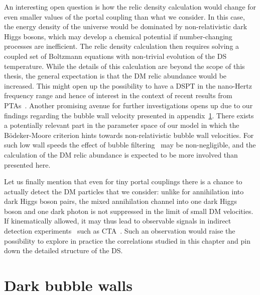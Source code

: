 An interesting open question is how the relic density calculation would change for even smaller values of the portal coupling than what we consider. In this case, the energy density of the universe would be dominated by non-relativistic dark Higgs bosons, which may develop a chemical potential if number-changing processes are inefficient. The relic density calculation then requires solving a coupled set of Boltzmann equations with non-trivial evolution of the \ac{DS} temperature. While the details of this calculation are beyond the scope of this thesis, the general expectation is that the \ac{DM} relic abundance  would be increased. This might open up the possibility to have a \ac{DSPT} in the nano-Hertz frequency range and hence of interest in the context of recent results from \acp{PTA}~\cite{NANOGrav:2023gor, EPTA:2023fyk, Reardon:2023gzh}. Another promising avenue for further investigations opens up due to our findings regarding the bubble wall velocity presented in appendix~\ref{app:darkwalls}. There exists a potentially relevant part in the parameter space of our model in which the 
Bödeker-Moore criterion hints towards non-relativistic bubble wall velocities. For such low wall speeds the effect of bubble 
filtering~\cite{Baker:2019ndr} may be non-negligible, and the calculation of the \ac{DM} relic abundance is expected to be more involved than presented here.

Let us finally mention that even for tiny portal couplings there is a chance to actually detect the \ac{DM} particles that we consider: unlike for annihilation into dark Higgs boson pairs, the mixed annihilation channel into one dark Higgs boson and one dark photon is not suppressed in the limit of small \ac{DM} velocities. If kinematically allowed, it  may thus lead to observable signals in indirect detection experiments~\cite{Bell:2016fqf} such as CTA~\cite{CTA:2020qlo}. Such an observation would raise the possibility to explore in practice the correlations studied in this chapter and pin down the detailed structure of the \ac{DS}.


\newpage

\appendix
\section{Dark bubble walls}
\label{app:darkwalls}

